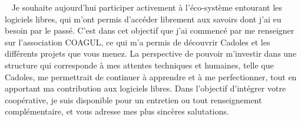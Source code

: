 \documentclass[11pt, a4paper]{awesome-cv}
\begin{document}
\begin{cvletter}
~\vspace{-0.4cm}
Je souhaite aujourd'hui participer activement à l'éco-système entourant les logiciels libres, qui m'ont permis d'accéder librement aux savoirs dont j'ai eu besoin par le passé. C'est dans cet objectif que j'ai commencé par me renseigner sur l'association COAGUL, ce qui m'a permis de découvrir Cadoles et les différents projets que vous menez. La perspective de pouvoir m'investir dans une structure qui corresponde à mes attentes techniques et humaines, telle que Cadoles, me permettrait de continuer à apprendre et à me perfectionner, tout en apportant ma contribution aux logiciels libres. Dans l'objectif d'intégrer votre coopérative, je suis disponible pour un entretien ou tout renseignement complémentaire, et vous adresse mes plus sincères salutations.
\end{cvletter}
~\vspace{-0.4cm}

\makeletterclosing
\end{document}
